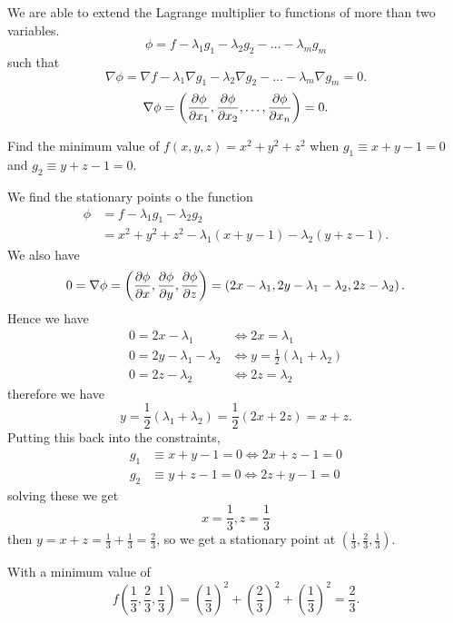 \documentclass[10pt, a4paper]{article}
\begin{document}
We are able to extend the Lagrange multiplier to functions of more than two variables.
\[
\phi = f - \lambda_1g_1 - \lambda_2g_2 - \dotsc - \lambda_mg_m
\]
such that
\[
\nabla\phi = \nabla f - \lambda_1\nabla g_1 - \lambda_2\nabla g_2 -\dotsc - \lambda_m\nabla g_m = 0.
\]
\[
\nabla\phi = \left(\pd[\phi]{x_1}, \pd[\phi]{x_2}, \dotsc, \pd[\phi]{x_n}\right) = 0.
\]

\begin{example}
    Find the minimum value of $f(x, y, z) = x ^ 2 + y ^ 2 + z ^ 2$ when $g_1 \equiv x + y - 1 = 0$ and $g_2 \equiv y + z - 1 = 0$.

    \begin{solution}
        We find the stationary points o the function
        \begin{align*}
            \phi &= f - \lambda_1g_1 - \lambda_2g_2 \\
            &= x ^ 2 + y ^ 2 + z ^ 2 - \lambda_1(x + y - 1) - \lambda_2(y + z - 1).
        \end{align*}
        We also have
        \[
        0 = \nabla \phi = \left(\pd[\phi]{x}, \pd[\phi]{y}, \pd[\phi]{z}\right) = \left(2x - \lambda_1, 2y - \lambda_1 - \lambda_2, 2z - \lambda_2\right).
        \]
        Hence we have
        \begin{align*}
            0 = 2x - \lambda_1 &\iff 2x = \lambda_1 \\
            0 = 2y - \lambda_1 - \lambda_2 &\iff y = \frac{1}{2}(\lambda_1 + \lambda_2) \\
            0 = 2z - \lambda_2 &\iff 2z = \lambda_2
        \end{align*}
        therefore we have
        \[
        y = \frac{1}{2}(\lambda_1 + \lambda_2) = \frac{1}{2}(2x + 2z) = x + z.
        \]
        Putting this back into the constraints,
        \begin{align*}
            g_1 &\equiv x + y - 1 = 0 \iff 2x + z - 1 = 0 \\
            g_2 &\equiv y + z - 1 = 0 \iff 2z + y - 1 = 0
        \end{align*}
        solving these we get
        \[
        x = \frac{1}{3}, z = \frac{1}{3}
        \]
        then $y = x + z = \frac{1}{3} + \frac{1}{3} = \frac{2}{3}$,
        so we get a stationary point at $\left(\frac{1}{3}, \frac{2}{3}, \frac{1}{3}\right)$.

        With a minimum value of
        \[
        f\left(\frac{1}{3}, \frac{2}{3}, \frac{1}{3}\right) = \left(\frac{1}{3}\right) ^ 2 + \left(\frac{2}{3}\right) ^ 2 + \left(\frac{1}{3}\right) ^ 2 = \frac{2}{3}.
        \]
    \end{solution}
\end{example}
\end{document}
